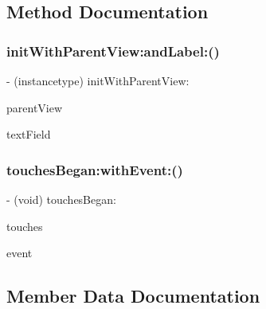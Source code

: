 \subsection{Method Documentation}
\hypertarget{interface_text_delegate_handler_a2e1a7bea6b217ef07429a92c93bb870c}{}\label{interface_text_delegate_handler_a2e1a7bea6b217ef07429a92c93bb870c} 
\subsubsection{\texorpdfstring{init\+With\+Parent\+View\+:and\+Label\+:()}{initWithParentView:andLabel:()}}
{\footnotesize\ttfamily -\/ (instancetype) init\+With\+Parent\+View\+: \begin{DoxyParamCaption}\item[{(U\+I\+View $\ast$)}]{parent\+View }\item[{andLabel:(U\+I\+Text\+Field $\ast$)}]{text\+Field }\end{DoxyParamCaption}}

\hypertarget{interface_text_delegate_handler_adb2ecf511386cff2aec6c0e52c3aa4bc}{}\label{interface_text_delegate_handler_adb2ecf511386cff2aec6c0e52c3aa4bc} 
\subsubsection{\texorpdfstring{touches\+Began\+:with\+Event\+:()}{touchesBegan:withEvent:()}}
{\footnotesize\ttfamily -\/ (void) touches\+Began\+: \begin{DoxyParamCaption}\item[{(N\+S\+Set $\ast$)}]{touches }\item[{withEvent:(U\+I\+Event $\ast$)}]{event }\end{DoxyParamCaption}}



\subsection{Member Data Documentation}
\hypertarget{interface_text_delegate_handler_ad41af34d62ab741db728a7c0970064e8}{}\label{interface_text_delegate_handler_ad41af34d62ab741db728a7c0970064e8} 
